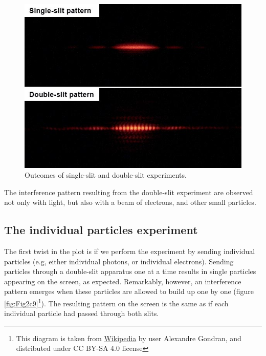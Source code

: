 \documentclass[
  9pt,
]{extbook}
\theoremstyle{definition}
\theoremstyle{definition}
\theoremstyle{definition}
\theoremstyle{remark}
\begin{document}
\begin{figure}

{\centering \includegraphics[width=0.7\linewidth]{./img/OEP_wiki3} 

}

\caption{Outcomes of single-slit and double-slit experiments.}\label{fig:Fig1c9}
\end{figure}

The interference pattern resulting from the double-slit experiment are observed not only with light, but also with a beam of electrons, and other small particles.

\hypertarget{the-individual-particles-experiment}{%
\subsection{The individual particles experiment}\label{the-individual-particles-experiment}}

The first twist in the plot is if we perform the experiment by sending individual particles (e.g, either individual photons, or individual electrons). Sending particles through a double-slit apparatus one at a time results in single particles appearing on the screen, as expected. Remarkably, however, an interference pattern emerges when these particles are allowed to build up one by one (figure \ref{fig:Fig2c9}\footnote{This diagram is taken from \href{https://en.wikipedia.org/wiki/Double-slit_experiment\#/media/File:Interference_electrons_double-slit_at_10cm.png}{Wikipedia} by user Alexandre Gondran, and distributed under CC BY-SA 4.0 license}). The resulting pattern on the screen is the same as if each individual particle had passed through both slits.
\end{document}
